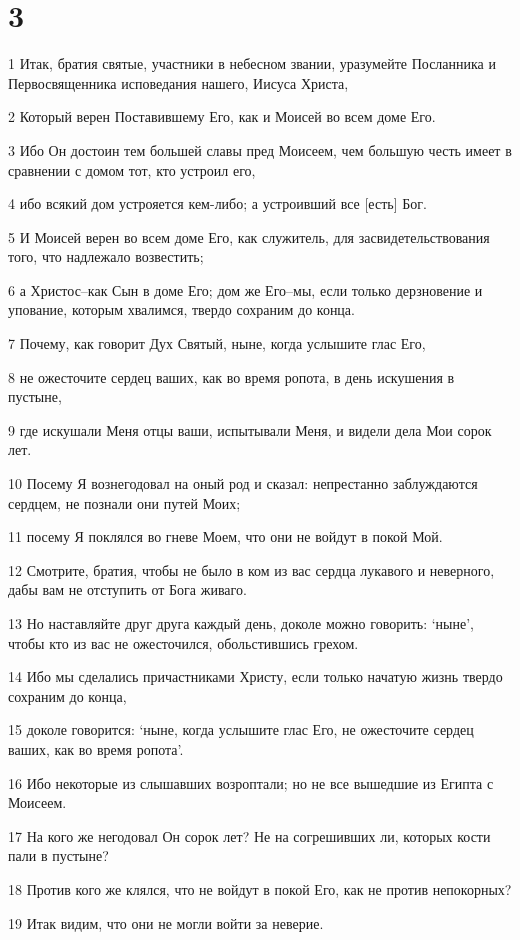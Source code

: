\chapter{3}

\par 1 Итак, братия святые, участники в небесном звании, уразумейте Посланника и Первосвященника исповедания нашего, Иисуса Христа,
\par 2 Который верен Поставившему Его, как и Моисей во всем доме Его.
\par 3 Ибо Он достоин тем большей славы пред Моисеем, чем большую честь имеет в сравнении с домом тот, кто устроил его,
\par 4 ибо всякий дом устрояется кем-либо; а устроивший все [есть] Бог.
\par 5 И Моисей верен во всем доме Его, как служитель, для засвидетельствования того, что надлежало возвестить;
\par 6 а Христос--как Сын в доме Его; дом же Его--мы, если только дерзновение и упование, которым хвалимся, твердо сохраним до конца.
\par 7 Почему, как говорит Дух Святый, ныне, когда услышите глас Его,
\par 8 не ожесточите сердец ваших, как во время ропота, в день искушения в пустыне,
\par 9 где искушали Меня отцы ваши, испытывали Меня, и видели дела Мои сорок лет.
\par 10 Посему Я вознегодовал на оный род и сказал: непрестанно заблуждаются сердцем, не познали они путей Моих;
\par 11 посему Я поклялся во гневе Моем, что они не войдут в покой Мой.
\par 12 Смотрите, братия, чтобы не было в ком из вас сердца лукавого и неверного, дабы вам не отступить от Бога живаго.
\par 13 Но наставляйте друг друга каждый день, доколе можно говорить: `ныне', чтобы кто из вас не ожесточился, обольстившись грехом.
\par 14 Ибо мы сделались причастниками Христу, если только начатую жизнь твердо сохраним до конца,
\par 15 доколе говорится: `ныне, когда услышите глас Его, не ожесточите сердец ваших, как во время ропота'.
\par 16 Ибо некоторые из слышавших возроптали; но не все вышедшие из Египта с Моисеем.
\par 17 На кого же негодовал Он сорок лет? Не на согрешивших ли, которых кости пали в пустыне?
\par 18 Против кого же клялся, что не войдут в покой Его, как не против непокорных?
\par 19 Итак видим, что они не могли войти за неверие.

